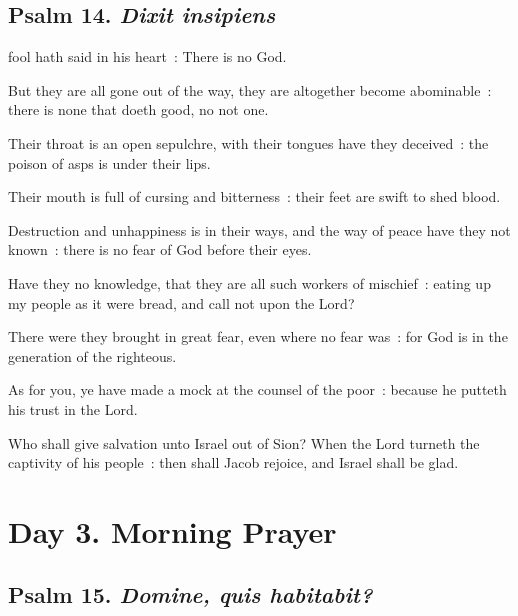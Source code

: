 \subsection{Psalm 14. \textit{Dixit insipiens}}

 fool hath said in his heart~: There is no God.\par
{}
But they are all gone out of the way, they are altogether become abominable~: there is none that doeth good, no not one.\par
{}Their throat is an open sepulchre, with their tongues have they deceived~: the poison of asps is under their lips.\par
{}Their mouth is full of cursing and bitterness~: their feet are swift to shed blood.\par
{}Destruction and unhappiness is in their ways, and the way of peace have they not known~: there is no fear of God before their eyes.\par
{}Have they no knowledge, that they are all such workers of mischief~: eating up my people as it were bread, and call not upon the Lord?\par
{}There were they brought in great fear, even where no fear was~: for God is in the generation of the righteous.\par
{}As for you, ye have made a mock at the counsel of the poor~: because he putteth his trust in the Lord.\par
{}Who shall give salvation unto Israel out of Sion? When the Lord turneth the captivity of his people~: then shall Jacob rejoice, and Israel shall be glad.\par

\clearpage
\section*{Day 3. Morning Prayer}

\vspace{-0.25\baselineskip}

\subsection{Psalm 15. \textit{Domine, quis habitabit?}}

